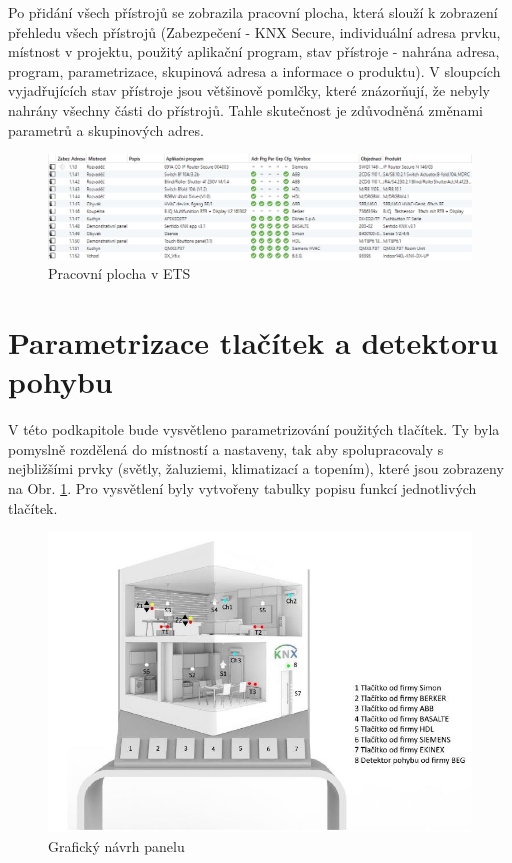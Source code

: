 Po přidání všech přístrojů se zobrazila pracovní plocha, která slouží k zobrazení přehledu všech přístrojů (Zabezpečení - KNX Secure, individuální adresa prvku, místnost v projektu, použitý aplikační program, stav přístroje - nahrána adresa, program, parametrizace, skupinová adresa a informace o produktu). V sloupcích vyjadřujících stav přístroje jsou většinově pomlčky, které znázorňují, že nebyly nahrány všechny části do přístrojů. Tahle skutečnost je zdůvodněná změnami parametrů a skupinových adres.

\begin{figure}[!ht]
  \begin{center}
    \includegraphics[scale=0.5]{obrazky/Přístroje v ETS.png}
  \end{center}
  \caption[Pracovní plocha v ETS]{Pracovní plocha v ETS}
  \label{fig:Pracovní plocha v ETS}
\end{figure}

\section{Parametrizace tlačítek a detektoru pohybu}
V této podkapitole bude vysvětleno parametrizování použitých tlačítek. Ty byla pomyslně rozdělená do místností a nastaveny, tak aby spolupracovaly s nejbližšími prvky (světly, žaluziemi, klimatizací a topením), které jsou zobrazeny na Obr. \ref{}. Pro vysvětlení byly vytvořeny tabulky popisu funkcí jednotlivých tlačítek. 

\begin{figure}[!h]
  \begin{center}
    \includegraphics[scale=0.7]{obrazky/Panel_vzhled.png}
  \end{center}
  \caption[Grafický návrh panelu \cite{Mitrenga}]{Grafický návrh panelu \cite{Mitrenga}}
  \label{fig:Vzheled panelu}
\end{figure}

